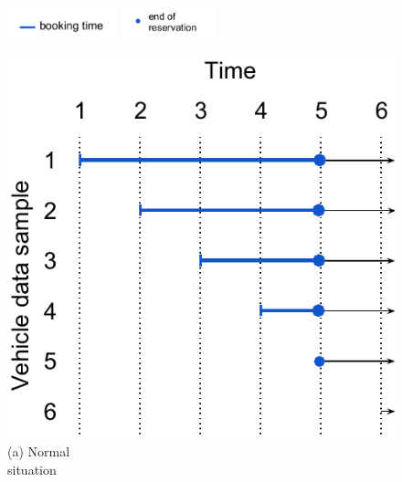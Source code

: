 \begin{figure}[!htb]
	
      \centering
      \includegraphics[height=1cm]{modo_methodology/time.pdf}
   	  \quad 
      \includegraphics[height=1cm]{modo_methodology/point.pdf}
 

    \medskip
    
    \begin{minipage}[b]{0.32\columnwidth}
    \centering
     \includegraphics[width=\linewidth]{modo_methodology/Normal_Situation.pdf}
     {\\(a) Normal \\situation}
    \end{minipage}
    \begin{minipage}[b]{0.32\columnwidth}
     \centering

\end{minipage}
\end{figure}
